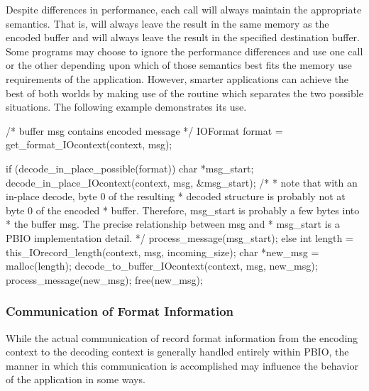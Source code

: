 Despite differences in performance, each call will always maintain the
appropriate semantics.
That is,  will always leave the result in
the same memory as the encoded buffer and  will
always leave the result in the specified destination buffer.  Some programs
may choose to ignore the performance differences and use one call or the other
depending upon which of those semantics best fits the memory use requirements
of the application.  However, smarter applications can achieve the best of
both worlds by making use of the  routine
which separates the two possible situations.  The following example
demonstrates its use.
\begin{Code}
    /* buffer msg contains encoded message */
    IOFormat format = get_format_IOcontext(context, msg);

    if (decode_in_place_possible(format)) {
        char *msg_start;
        decode_in_place_IOcontext(context, msg, &msg_start);
        /*
         * note that with an in-place decode, byte 0 of the resulting
         * decoded structure is probably not at byte 0 of the encoded
         * buffer.  Therefore, msg_start is probably a few bytes into
         * the buffer msg.  The precise relationship between msg and
         * msg_start is a PBIO implementation detail.
         */
        process_message(msg_start);
    } else {
        int length = this_IOrecord_length(context, msg, incoming_size);
        char *new_msg = malloc(length);
        decode_to_buffer_IOcontext(context, msg, new_msg);
        process_message(new_msg);
        free(new_msg);
    }

\end{Code}
\subsubsection{Communication of Format Information\label{sec:formats}}
While the actual communication of record format information from the
encoding context to the decoding context is generally handled entirely
within PBIO, the manner in which this communication is accomplished may
influence the behavior of the application in some ways.

